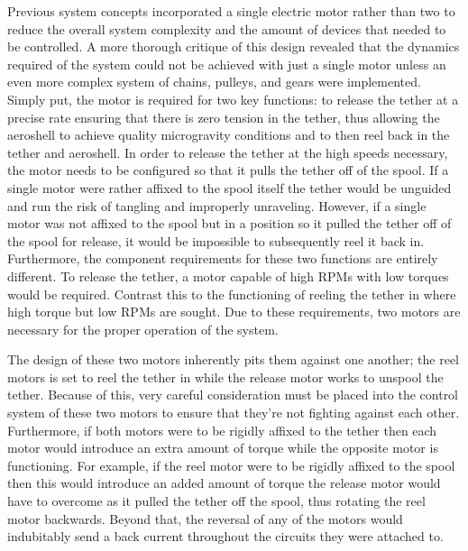 \indent\indent Previous system concepts incorporated a single electric motor rather than two to reduce the overall system complexity and the amount of devices that needed to be controlled. A more thorough critique of this design revealed that the dynamics required of the system could not be achieved with just a single motor unless an even more complex system of chains, pulleys, and gears were implemented. Simply put, the motor is required for two key functions: to release the tether at a precise rate ensuring that there is zero tension in the tether, thus allowing the aeroshell to achieve quality microgravity conditions and to then reel back in the tether and aeroshell. In order to release the tether at the high speeds necessary, the motor needs to be configured so that it pulls the tether off of the spool. If a single motor were rather affixed to the spool itself the tether would be unguided and run the risk of tangling and improperly unraveling. However, if a single motor was not affixed to the spool but in a position so it pulled the tether off of the spool for release, it would be impossible to subsequently reel it back in. Furthermore, the component requirements for these two functions are entirely different. To release the tether, a motor capable of high RPMs with low torques would be required. Contrast this to the functioning of reeling the tether in where high torque but low RPMs are sought. Due to these requirements, two motors are necessary for the proper operation of the system. 

\indent\indent The design of these two motors inherently pits them against one another; the reel motors is set to reel the tether in while the release motor works to unspool the tether. Because of this, very careful consideration must be placed into the control system of these two motors to ensure that they're not fighting against each other. Furthermore, if both motors were to be rigidly affixed to the tether then each motor would introduce an extra amount of torque while the opposite motor is functioning. For example, if the reel motor were to be rigidly affixed to the spool then this would introduce an added amount of torque the release motor would have to overcome as it pulled the tether off the spool, thus rotating the reel motor backwards. Beyond that, the reversal of any of the motors would indubitably send a back current throughout the circuits they were attached to. 


